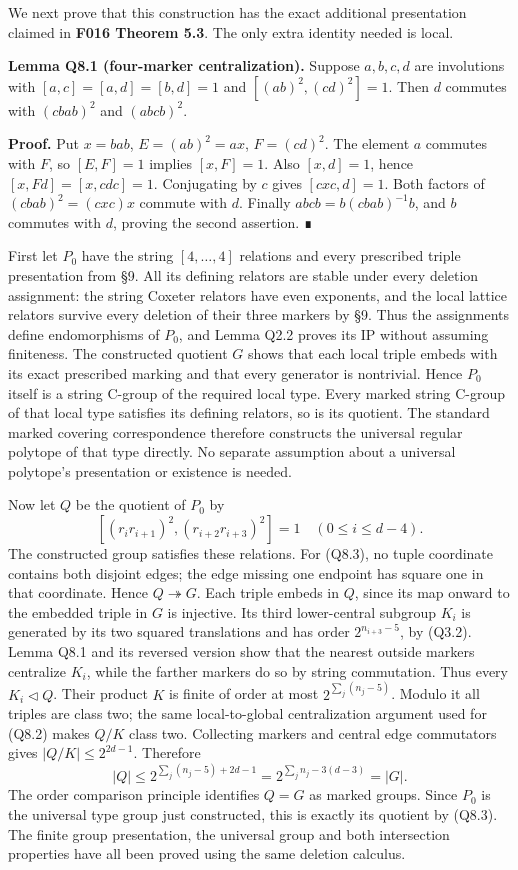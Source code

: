 \documentclass[
  10pt,
  letterpaper,
]{article}
\begin{document}
We next prove that this construction has the exact additional
presentation claimed in \textbf{F016 Theorem 5.3}. The only extra
identity needed is local.

\textbf{Lemma Q8.1 (four-marker centralization).} Suppose \(a,b,c,d\)
are involutions with \([a,c]=[a,d]=[b,d]=1\) and \([ (ab)^2,(cd)^2]=1\).
Then \(d\) commutes with \((cbab)^2\) and \((abcb)^2\).

\textbf{Proof.} Put \(x=bab\), \(E=(ab)^2=ax\), \(F=(cd)^2\). The
element \(a\) commutes with \(F\), so \([E,F]=1\) implies \([x,F]=1\).
Also \([x,d]=1\), hence \([x,Fd]=[x,cdc]=1\). Conjugating by \(c\) gives
\([cxc,d]=1\). Both factors of \((cbab)^2=(cxc)x\) commute with \(d\).
Finally \(abcb=b(cbab)^{-1}b\), and \(b\) commutes with \(d\), proving
the second assertion. ∎

First let \(P_0\) have the string \([4,\ldots,4]\) relations and every
prescribed triple presentation from §9. All its defining relators are
stable under every deletion assignment: the string Coxeter relators have
even exponents, and the local lattice relators survive every deletion of
their three markers by §9. Thus the assignments define endomorphisms of
\(P_0\), and Lemma Q2.2 proves its IP without assuming finiteness. The
constructed quotient \(G\) shows that each local triple embeds with its
exact prescribed marking and that every generator is nontrivial. Hence
\(P_0\) itself is a string C-group of the required local type. Every
marked string C-group of that local type satisfies its defining
relators, so is its quotient. The standard marked covering
correspondence therefore constructs the universal regular polytope of
that type directly. No separate assumption about a universal polytope's
presentation or existence is needed.

Now let \(Q\) be the quotient of \(P_0\) by \[
 [(r_i r_{i+1})^2,(r_{i+2}r_{i+3})^2]=1
 \quad(0\le i\le d-4).                                  \tag{Q8.3}
\] The constructed group satisfies these relations. For (Q8.3), no tuple
coordinate contains both disjoint edges; the edge missing one endpoint
has square one in that coordinate. Hence \(Q\twoheadrightarrow G\). Each
triple embeds in \(Q\), since its map onward to the embedded triple in
\(G\) is injective. Its third lower-central subgroup \(K_i\) is
generated by its two squared translations and has order
\(2^{n_{i+3}-5}\), by (Q3.2). Lemma Q8.1 and its reversed version show
that the nearest outside markers centralize \(K_i\), while the farther
markers do so by string commutation. Thus every \(K_i\lhd Q\). Their
product \(K\) is finite of order at most \(2^{\sum_j(n_j-5)}\). Modulo
it all triples are class two; the same local-to-global centralization
argument used for (Q8.2) makes \(Q/K\) class two. Collecting markers and
central edge commutators gives \(|Q/K|\le2^{2d-1}\). Therefore \[
 |Q|\le2^{\sum_j(n_j-5)+2d-1}
      =2^{\sum_j n_j-3(d-3)}=|G|.
\] The order comparison principle identifies \(Q=G\) as marked groups.
Since \(P_0\) is the universal type group just constructed, this is
exactly its quotient by (Q8.3). The finite group presentation, the
universal group and both intersection properties have all been proved
using the same deletion calculus.
\end{document}
